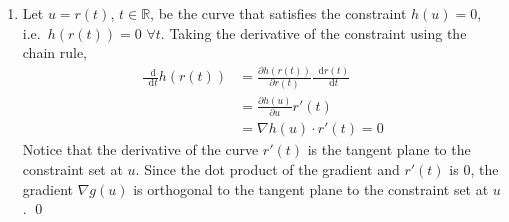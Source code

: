 \documentclass[letterpaper,12pt,titlepage]{article}
\newcommand*\dif{\mathop{}\!\mathrm{d}}
\newcommand*\pder[2]{\frac{\partial #1}{\partial #2}}
\newcommand*\R{\mathbb{R}}
\begin{document}
\begin{enumerate}[leftmargin=0pt]
\begin{enumerate}
  \item Let $u=r(t)$, $t\in\R$, be the curve that satisfies the constraint $h(u)=0$, i.e.\ $h(r(t))=0$ $\forall t$. Taking the derivative of the constraint using the chain rule,
    \begin{align}
      \frac{\dif}{\dif t} h(r(t)) &= \pder{h(r(t))}{r(t)} \frac{\dif r(t)}{\dif t} \\
                                  &= \pder{h(u)}{u} r'(t) \\
                                  &= \nabla h(u) \cdot r'(t) = 0
    \end{align}
    Notice that the derivative of the curve $r'(t)$ is the tangent plane to the constraint set at $u$. Since the dot product of the gradient and $r'(t)$ is 0, the gradient $\nabla g(u)$ is orthogonal to the tangent plane to the constraint set at $u$. \qed
  \end{enumerate}


\end{enumerate}
\end{document}
